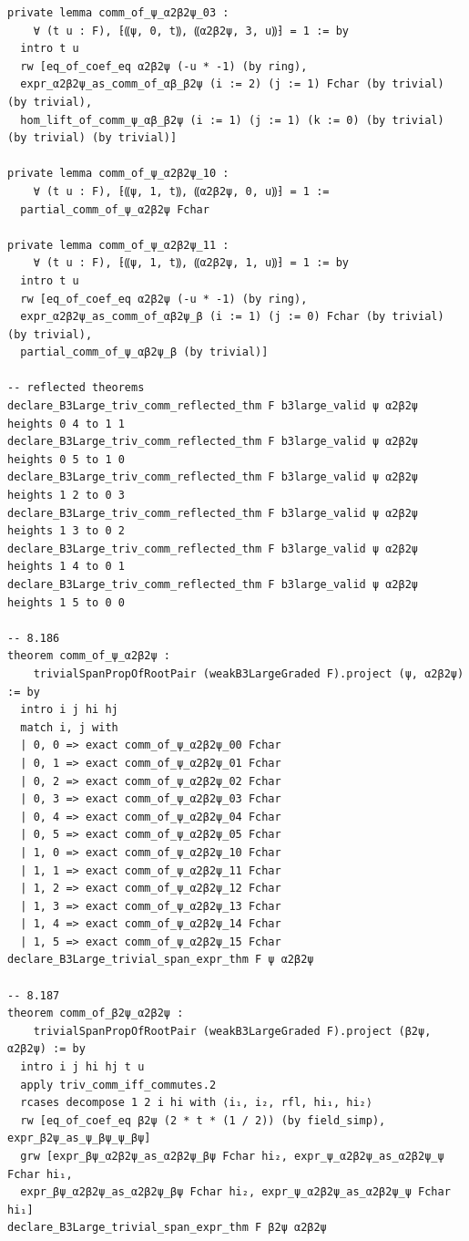 \documentclass[10pt,a4paper]{article}
\begin{document}
\begin{Verbatim}
private lemma comm_of_ψ_α2β2ψ_03 :
    ∀ (t u : F), ⁅⸨ψ, 0, t⸩, ⸨α2β2ψ, 3, u⸩⁆ = 1 := by
  intro t u
  rw [eq_of_coef_eq α2β2ψ (-u * -1) (by ring),
  expr_α2β2ψ_as_comm_of_αβ_β2ψ (i := 2) (j := 1) Fchar (by trivial) (by trivial),
  hom_lift_of_comm_ψ_αβ_β2ψ (i := 1) (j := 1) (k := 0) (by trivial) (by trivial) (by trivial)]

private lemma comm_of_ψ_α2β2ψ_10 :
    ∀ (t u : F), ⁅⸨ψ, 1, t⸩, ⸨α2β2ψ, 0, u⸩⁆ = 1 :=
  partial_comm_of_ψ_α2β2ψ Fchar

private lemma comm_of_ψ_α2β2ψ_11 :
    ∀ (t u : F), ⁅⸨ψ, 1, t⸩, ⸨α2β2ψ, 1, u⸩⁆ = 1 := by
  intro t u
  rw [eq_of_coef_eq α2β2ψ (-u * -1) (by ring),
  expr_α2β2ψ_as_comm_of_αβ2ψ_β (i := 1) (j := 0) Fchar (by trivial) (by trivial),
  partial_comm_of_ψ_αβ2ψ_β (by trivial)]

-- reflected theorems
declare_B3Large_triv_comm_reflected_thm F b3large_valid ψ α2β2ψ heights 0 4 to 1 1
declare_B3Large_triv_comm_reflected_thm F b3large_valid ψ α2β2ψ heights 0 5 to 1 0
declare_B3Large_triv_comm_reflected_thm F b3large_valid ψ α2β2ψ heights 1 2 to 0 3
declare_B3Large_triv_comm_reflected_thm F b3large_valid ψ α2β2ψ heights 1 3 to 0 2
declare_B3Large_triv_comm_reflected_thm F b3large_valid ψ α2β2ψ heights 1 4 to 0 1
declare_B3Large_triv_comm_reflected_thm F b3large_valid ψ α2β2ψ heights 1 5 to 0 0

-- 8.186
theorem comm_of_ψ_α2β2ψ :
    trivialSpanPropOfRootPair (weakB3LargeGraded F).project (ψ, α2β2ψ) := by
  intro i j hi hj
  match i, j with
  | 0, 0 => exact comm_of_ψ_α2β2ψ_00 Fchar
  | 0, 1 => exact comm_of_ψ_α2β2ψ_01 Fchar
  | 0, 2 => exact comm_of_ψ_α2β2ψ_02 Fchar
  | 0, 3 => exact comm_of_ψ_α2β2ψ_03 Fchar
  | 0, 4 => exact comm_of_ψ_α2β2ψ_04 Fchar
  | 0, 5 => exact comm_of_ψ_α2β2ψ_05 Fchar
  | 1, 0 => exact comm_of_ψ_α2β2ψ_10 Fchar
  | 1, 1 => exact comm_of_ψ_α2β2ψ_11 Fchar
  | 1, 2 => exact comm_of_ψ_α2β2ψ_12 Fchar
  | 1, 3 => exact comm_of_ψ_α2β2ψ_13 Fchar
  | 1, 4 => exact comm_of_ψ_α2β2ψ_14 Fchar
  | 1, 5 => exact comm_of_ψ_α2β2ψ_15 Fchar
declare_B3Large_trivial_span_expr_thm F ψ α2β2ψ

-- 8.187
theorem comm_of_β2ψ_α2β2ψ :
    trivialSpanPropOfRootPair (weakB3LargeGraded F).project (β2ψ, α2β2ψ) := by
  intro i j hi hj t u
  apply triv_comm_iff_commutes.2
  rcases decompose 1 2 i hi with ⟨i₁, i₂, rfl, hi₁, hi₂⟩
  rw [eq_of_coef_eq β2ψ (2 * t * (1 / 2)) (by field_simp), expr_β2ψ_as_ψ_βψ_ψ_βψ]
  grw [expr_βψ_α2β2ψ_as_α2β2ψ_βψ Fchar hi₂, expr_ψ_α2β2ψ_as_α2β2ψ_ψ Fchar hi₁,
  expr_βψ_α2β2ψ_as_α2β2ψ_βψ Fchar hi₂, expr_ψ_α2β2ψ_as_α2β2ψ_ψ Fchar hi₁]
declare_B3Large_trivial_span_expr_thm F β2ψ α2β2ψ


\end{Verbatim}
\end{document}
